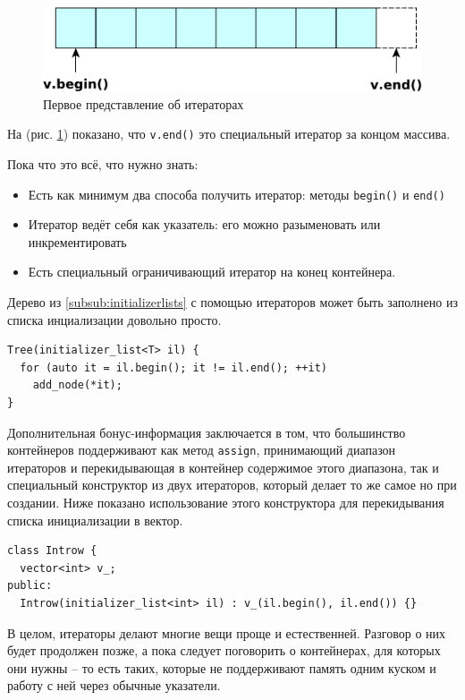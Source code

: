 \documentclass[a4paper,12pt,oneside]{book}
\begin{document}
\begin{figure}[h!]
\centering
\includegraphics[width=1.0\textwidth]{illustrations/iter-starter-crop.pdf}
\caption{Первое представление об итераторах}
\label{fig:iter_starter}
\end{figure}

На (рис. \ref{fig:iter_starter}) показано, что \lstinline!v.end()! это специальный итератор за концом массива.

Пока что это всё, что нужно знать:
\begin{itemize}
\item Есть как минимум два способа получить итератор: методы \lstinline!begin()! и \lstinline!end()!
\item Итератор ведёт себя как указатель: его можно разыменовать или инкрементировать
\item Есть специальный ограничивающий итератор на конец контейнера.
\end{itemize}

Дерево из \ref{subsub:initializerlists} с помощью итераторов может быть заполнено из списка инциализации довольно просто.

\begin{lstlisting}
Tree(initializer_list<T> il) {
  for (auto it = il.begin(); it != il.end(); ++it)
    add_node(*it);
}
\end{lstlisting}


Дополнительная бонус-информация заключается в том, что большинство контейнеров поддерживают как метод \lstinline!assign!, принимающий диапазон итераторов и перекидывающая в контейнер содержимое этого диапазона, так и специальный конструктор из двух итераторов, который делает то же самое но при создании. Ниже показано использование этого конструктора для перекидывания списка инициализации в вектор.

\begin{lstlisting}
class Introw {
  vector<int> v_;
public:
  Introw(initializer_list<int> il) : v_(il.begin(), il.end()) {}
\end{lstlisting}

В целом, итераторы делают многие вещи проще и естественней. Разговор о них будет продолжен позже, а пока следует поговорить о контейнерах, для которых они нужны -- то есть таких, которые не поддерживают память одним куском и работу с ней через обычные указатели.
\end{document}
